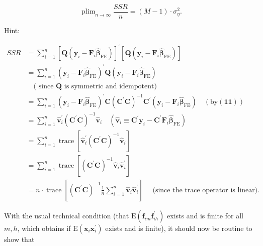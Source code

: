 \documentclass[10pt]{article}
\begin{document}
$$
\operatorname{plim}_{n \rightarrow \infty} \frac{S S R}{n}=(M-1) \cdot \sigma_{\eta}^{2} .
$$

Hint:

$$
\begin{aligned}
S S R & =\sum_{i=1}^{n}\left[\mathbf{Q}\left(\mathbf{y}_{i}-\mathbf{F}_{i} \widehat{\boldsymbol{\beta}}_{\mathrm{FE}}\right)\right]^{\prime}\left[\mathbf{Q}\left(\mathbf{y}_{i}-\mathbf{F}_{i} \widehat{\boldsymbol{\beta}}_{\mathrm{FE}}\right)\right] \\
& =\sum_{i=1}^{n}\left(\mathbf{y}_{i}-\mathbf{F}_{i} \widehat{\boldsymbol{\beta}}_{\mathrm{FE}}\right)^{\prime} \mathbf{Q}\left(\mathbf{y}_{i}-\mathbf{F}_{i} \widehat{\boldsymbol{\beta}}_{\mathrm{FE}}\right) \\
& \quad(\text { since } \mathbf{Q} \text { is symmetric and idempotent) } \\
& =\sum_{i=1}^{n}\left(\mathbf{y}_{i}-\mathbf{F}_{i} \widehat{\boldsymbol{\beta}}_{\mathrm{FE}}\right)^{\prime} \mathbf{C}\left(\mathbf{C}^{\prime} \mathbf{C}\right)^{-1} \mathbf{C}^{\prime}\left(\mathbf{y}_{i}-\mathbf{F}_{i} \widehat{\boldsymbol{\beta}}_{\mathrm{FE}}\right) \quad(\mathrm{by}(\mathbf{1 1})) \\
& =\sum_{i=1}^{n} \hat{\mathbf{v}}_{i}^{\prime}\left(\mathbf{C}^{\prime} \mathbf{C}\right)^{-1} \hat{\mathbf{v}}_{i} \quad\left(\hat{\mathbf{v}}_{i} \equiv \mathbf{C}^{\prime} \mathbf{y}_{i}-\mathbf{C}^{\prime} \mathbf{F}_{i} \widehat{\boldsymbol{\beta}}_{\mathrm{FE}}\right) \\
& =\sum_{i=1}^{n} \operatorname{trace}\left[\hat{\mathbf{v}}_{i}^{\prime}\left(\mathbf{C}^{\prime} \mathbf{C}\right)^{-1} \hat{\mathbf{v}}_{i}\right] \\
& =\sum_{i=1}^{n} \operatorname{trace}\left[\left(\mathbf{C}^{\prime} \mathbf{C}\right)^{-1} \hat{\mathbf{v}}_{i} \hat{\mathbf{v}}_{i}^{\prime}\right] \\
& =n \cdot \operatorname{trace}\left[\left(\mathbf{C}^{\prime} \mathbf{C}\right)^{-1} \frac{1}{n} \sum_{i=1}^{n} \hat{\mathbf{v}}_{i} \hat{\mathbf{v}}_{i}^{\prime}\right] \quad \text { (since the trace operator is linear). }
\end{aligned}
$$

With the usual technical condition (that $\mathrm{E}\left(\mathbf{f}_{i m} \mathbf{f}_{i h}^{\prime}\right)$ exists and is finite for all $m, h$, which obtains if $\mathrm{E}\left(\mathbf{x}_{i} \mathbf{x}_{i}^{\prime}\right)$ exists and is finite), it should now be routine to show that
\end{document}
